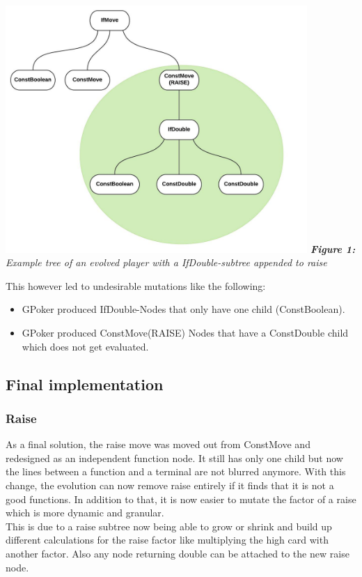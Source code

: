 \documentclass[12pt,fleqn,a4paper]{article}
\begin{document}
\begin{center}
	\includegraphics[width=0.86\textwidth]{raise_subtree_1.png}
	\textit{\textbf{Figure 1: }Example tree of an evolved player with a IfDouble-subtree appended to raise}
\end{center}

This however led to undesirable mutations like the following:
\begin{itemize}
	\item GPoker produced IfDouble-Nodes that only have one child
	(ConstBoolean).
	\item GPoker produced ConstMove(RAISE) Nodes that have a
	ConstDouble child which does not get evaluated.
\end{itemize}

\newpage
\subsection{Final implementation}
\subsubsection{Raise}
As a final solution, the raise move was moved out from ConstMove and redesigned as an independent function node. It still has only one child but now the lines between a function and a terminal are not blurred anymore. With this change, the evolution can now remove raise entirely if it finds that it is not a good functions. In addition to that, it is now easier to mutate the factor of a raise which is more dynamic and granular. \\
This is due to a raise subtree now being able to grow or shrink and build up different calculations for the raise factor like multiplying the high card with another factor. Also any node returning double can be attached to the new raise node.
\end{document}
